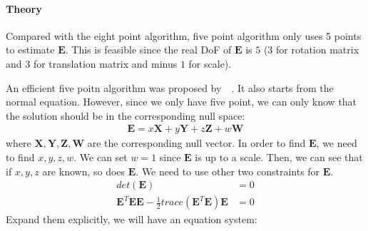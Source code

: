 \documentclass[a4paper]{report}
\begin{document}
\paragraph{Theory}
Compared with the eight point algorithm, five point algorithm only uses 5 points to estimate $\mathbf{E}$. This is feasible since the real DoF of $\mathbf{E}$ is $5$ ($3$ for rotation matrix and $3$ for translation matrix and minus $1$ for scale).

An efficient five poitn algorithm was proposed by~\cite{nister2003efficient}~\cite{nister2004efficient}. It also starts from the normal equation. However, since  we only have five point, we can only know that the solution should be in the corresponding null space:
\begin{align*}
	\mathbf{E}=x\mathbf{X}+y\mathbf{Y}+z\mathbf{Z}+w\mathbf{W}
\end{align*}
where $\mathbf{X,Y,Z,W}$ are the corresponding null vector. In order to find $\mathbf{E}$, we need to find $x,y,z,w$. We can set $w=1$ since $\mathbf{E}$ is up to a scale. Then, we can see that if $x,y,z$ are known, so does $\mathbf{E}$. We need to use other two constraints for $\mathbf{E}$.
\begin{align*}
	det(\mathbf{E})&=0 \\
	\mathbf{E}^T\mathbf{E}\mathbf{E}-\frac{1}{2}trace(\mathbf{E}^T\mathbf{E})\mathbf{E}&=0
\end{align*}
Expand them explicitly, we will have an equation system:
\end{document}

